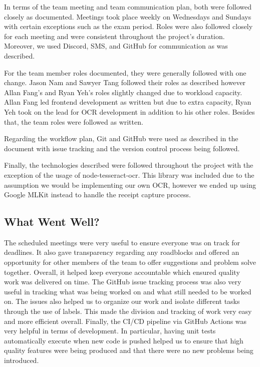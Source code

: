 \documentclass{article}
\begin{document}

In terms of the team meeting and team communication plan, both were followed closely as documented.
Meetings took place weekly on Wednesdays and Sundays with certain exceptions such as the exam period. Roles were
also followed closely for each meeting and were consistent throughout the project's duration. Moreover, we used Discord,
SMS, and GitHub for communication as was described.

For the team member roles documented, they were generally followed with one change. Jason Nam and Sawyer Tang
followed their roles as described however Allan Fang's and Ryan Yeh's roles slightly changed due to workload capacity.
Allan Fang led frontend development as written but due to extra capacity, Ryan Yeh took on the lead for OCR development in addition
to his other roles. Besides that, the team roles were followed as written.

Regarding the workflow plan, Git and GitHub were used as described in the document with issue tracking and the
version control process being followed.

Finally, the technologies described were followed throughout the project with the exception of the usage of
node-tesseract-ocr. This library was included due to the assumption we would be implementing our own OCR, however
we ended up using Google MLKit instead to handle the receipt capture process.

\subsection{What Went Well?}


The scheduled meetings were very useful to ensure everyone was on track for deadlines.
It also gave transparency regarding any roadblocks and offered an opportunity for other members
of the team to offer suggestions and problem solve together. Overall, it helped keep everyone accountable
which ensured quality work was delivered on time. The GitHub issue tracking process was also very
useful in tracking what was being worked on and what still needed to be worked on. The issues also helped us to organize
our work and isolate different tasks through the use of labels. This made the division and tracking of work
very easy and more efficient overall. Finally, the CI/CD pipeline via GitHub Actions was very helpful in terms
of development. In particular, having unit tests automatically execute when new code is
pushed helped us to ensure that high quality features were being produced and that there were no new problems being introduced.
\end{document}
